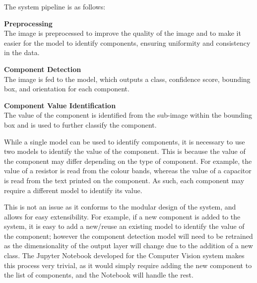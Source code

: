 The system pipeline is as follows:
\begin{mylist}
    \item \textbf{Preprocessing} \\
    The image is preprocessed to improve the quality of the image and to make it easier for the model to identify components, ensuring
    uniformity and consistency in the data.
    \item \textbf{Component Detection} \\
    The image is fed to the model, which outputs a class, confidence score, bounding box, and orientation for each component.
    \item \textbf{Component Value Identification} \\
    The value of the component is identified from the sub-image within the bounding box and is used to further classify the component.
\end{mylist}

While a single model can be used to identify components, it is necessary to use two models to identify the value of the component.
This is because the value of the component may differ depending on the type of component. For example, the value of a resistor
is read from the colour bands, whereas the value of a capacitor is read from the text printed on the component. As such, each
component may require a different model to identify its value.

This is not an issue as it conforms to the modular design of the system, and allows for easy extensibility. For example, if
a new component is added to the system, it is easy to add a new/reuse an existing model to identify the value of the component; however the 
component detection model will need to be retrained as the dimensionality of the output layer will change due to the addition
of a new class. The Jupyter Notebook developed for the Computer Vision system makes this process very trivial, as it would simply
require adding the new component to the list of components, and the Notebook will handle the rest. 
